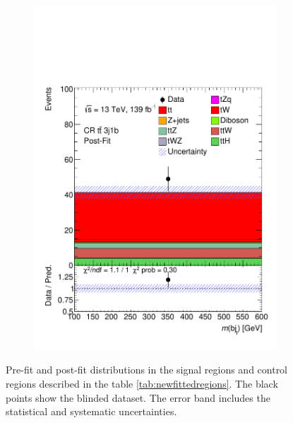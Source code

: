 \begin{figure}[!h]
\begin{subfigure}[b]{0.33\linewidth}
    \includegraphics[width=\textwidth]{ubonn-thesis/Chapters/Chapters_08/appendix/data/CR_3j1b_postFit.pdf}
   \caption{}
  \end{subfigure}%
  \caption{Pre-fit and post-fit distributions in the signal regions and control regions described in the table \ref{tab:newfittedregions}. The black points show the blinded dataset. The error band includes the statistical and systematic uncertainties.}
  \label{fig:newfit2}
  \end{figure}

 

